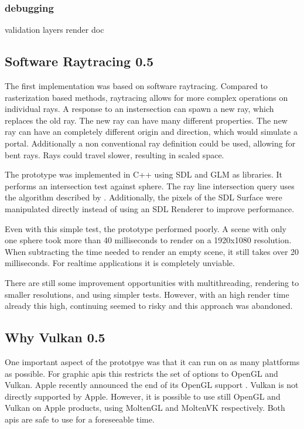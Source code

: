 \subsubsection{debugging}
validation layers render doc

\subsection{Software Raytracing 0.5}
The first implementation was based on software raytracing. Compared to rasterization based methods, raytracing allows for more complex operations on individual rays. A response to an instersection can spawn a new ray, which replaces the old ray. The new ray can have many different properties. The new ray can have an completely different origin and direction, which would simulate a portal. Additionally a non conventional ray definition could be used, allowing for bent rays. Rays could travel slower, resulting in scaled space.

The prototype was implemented in C++ using SDL \cite{SDL} and GLM \cite{GLM} as libraries. It performs an intersection test against sphere. The ray line intersection query uses the algorithm described by \textcite{eberly:2006:3d}. Additionally, the pixels of the SDL Surface were manipulated directly instead of using an SDL Renderer to improve performance.

Even with this simple test, the prototype performed poorly. A scene with only one sphere took more than 40 milliseconds to render on a 1920x1080 resolution. When subtracting the time needed to render an empty scene, it still takes over 20 milliseconds. For realtime applications it is completely unviable.

There are still some improvement opportunities with multithreading, rendering to smaller resolutions, and using simpler tests. However, with an high render time already this high, continuing seemed to risky and this approach was abandoned.


\subsection{Why Vulkan 0.5}
One important aspect of the prototpye was that it can run on as many plattforms as possible. %
For graphic \glspl{api} this restricts the set of options to OpenGL and Vulkan. Apple recently announced the end of its OpenGL support \cite{arstechnica:openGL}. Vulkan is not directly supported by Apple. However, it is possible to use still OpenGL and Vulkan on Apple products, using MoltenGL \cite{moltenGL} and MoltenVK \cite{moltenVK} respectively. Both \glspl{api} are safe to use for a foreseeable time.

